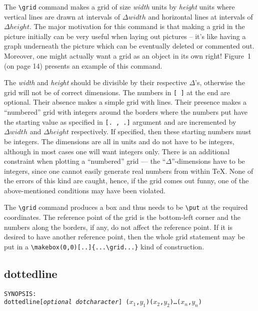 The \verb|\grid| command makes a grid of size {\it width\/} units by {\it
height\/} units where vertical lines are drawn at intervals of $\Delta width$
and horizontal lines at intervals of $\Delta height$. The major motivation
for this command is that making a grid in the picture initially can be
very useful when laying out pictures -- it's like having a graph underneath
the picture which can be eventually deleted or commented out. Moreover, one
might actually want a grid as an object in its own right! Figure~1 (on page
14) presents an example of this command.

The {\it width\/} and {\it height\/} should be divisible by their respective
$\Delta$'s, otherwise the grid will not be of correct dimensions. The numbers
in \verb|[ ]| at the end are optional. Their absence makes a simple grid with
lines. Their presence makes a ``numbered'' grid with integers around the
borders where the numbers put have the starting value as specified in
\verb|[. , .]| argument and are incremented by $\Delta width$ and $\Delta
height$ respectively. If specified, then these starting numbers must be
integers. The dimensions are all in units and do not have to be integers,
although in most cases one will want integers only. There is an additional
constraint when plotting a ``numbered'' grid --- the
\mbox{``$\Delta$''-dimensions} have to be integers, since one cannot easily
generate real numbers from within \TeX. None of the errors of this kind are
caught, hence, if the grid comes out funny, one of the above-mentioned
conditions may have been violated.

The \verb|\grid| command produces a box and thus needs to be \verb|\put| at
the required coordinates. The reference point of the grid is the bottom-left
corner and the numbers along the borders, if any, do not affect the reference
point. If it is desired to have another reference point, then the whole grid
statement may be put in a \verb|\makebox(0,0)[..]{...\grid...}| kind of
construction.

\subsection{{\tt \bs}dottedline}

{\tt SYNOPSIS:\\
\hspace*{\leftmargin}%
\bs dottedline[{\it optional dotcharacter}]\rb%
($x_1$,$y_1$)($x_2$,$y_2$)\ldots($x_n$,$y_n$)}

